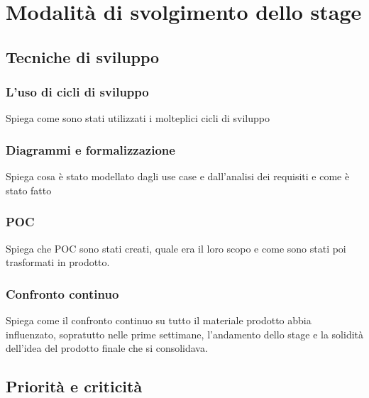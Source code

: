 
\chapter{Modalità di svolgimento dello stage}
\label{cap:modalita-svolgimento}
\section{Tecniche di sviluppo}
\subsection{L'uso di cicli di sviluppo}
Spiega come sono stati utilizzati i molteplici cicli di sviluppo

\subsection{Diagrammi e formalizzazione}
Spiega cosa è stato modellato dagli use case e dall'analisi dei requisiti e come è stato fatto

\subsection{POC}
Spiega che POC sono stati creati, quale era il loro scopo e come sono stati poi trasformati in prodotto.

\subsection{Confronto continuo}
Spiega come il confronto continuo su tutto il materiale prodotto abbia influenzato, sopratutto nelle prime settimane, l'andamento dello stage e la solidità dell'idea del prodotto finale che si consolidava.

\section{Priorità e criticità}

